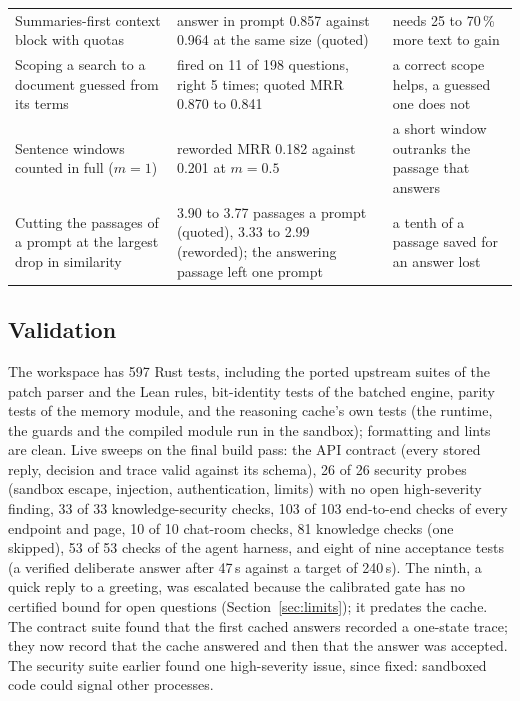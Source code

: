 \begin{table}[t]
\begin{tabular}{@{}p{4.2cm}p{7.6cm}p{4.6cm}@{}}
Summaries-first context block with quotas \cite{openviking2026} & answer in prompt 0.857 against 0.964 at the same size (quoted) & needs 25 to 70\,\% more text to gain \\
Scoping a search to a document guessed from its terms & fired on 11 of 198 questions, right 5 times; quoted MRR 0.870 to 0.841 & a correct scope helps, a guessed one does not \\
Sentence windows counted in full ($m=1$) & reworded MRR 0.182 against 0.201 at $m=0.5$ & a short window outranks the passage that answers \\
Cutting the passages of a prompt at the largest drop in similarity & 3.90 to 3.77 passages a prompt (quoted), 3.33 to 2.99 (reworded); the answering passage left one prompt & a tenth of a passage saved for an answer lost \\
\bottomrule
\end{tabular}
\end{table}

\subsection{Validation}
\label{sec:eval:validation}
The workspace has 597 Rust tests, including the ported upstream suites of the
patch parser and the Lean rules, bit-identity tests of the batched engine,
parity tests of the memory module, and the reasoning cache's own tests (the
runtime, the guards and the compiled module run in the sandbox); formatting
and lints are clean. Live sweeps on the final build pass: the API contract
(every stored reply, decision and trace valid against its schema), 26 of 26
security probes (sandbox escape, injection, authentication, limits) with no
open high-severity finding, 33 of 33 knowledge-security checks, 103 of 103
end-to-end checks of every endpoint and page, 10 of 10 chat-room checks, 81
knowledge checks (one skipped), 53 of 53 checks of the agent harness, and
eight of nine acceptance tests (a verified deliberate answer after 47\,s
against a target of 240\,s). The ninth, a quick reply to a greeting, was
escalated because the calibrated gate has no certified bound for open
questions (Section~\ref{sec:limits}); it predates the cache. The contract
suite found that the first cached answers recorded a one-state trace; they
now record that the cache answered and then that the answer was accepted. The
security suite earlier found one high-severity issue, since fixed: sandboxed
code could signal other processes.

